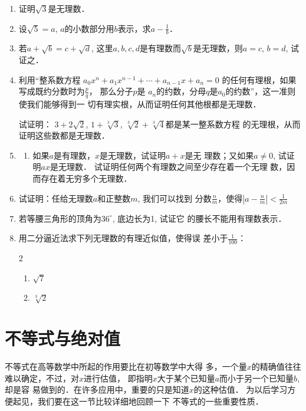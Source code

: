 \begin{enumerate}
    \item 证明$\sqrt{3}$是无理数．
    \item 设$\sqrt{5}=a$, $a$的小数部分用$b$表示，求$a-\frac{1}{b}$．
\item 若$a+\sqrt{b}=c+\sqrt{d}$, 这里$a,b,c,d$是有理数而$\sqrt{b}$是无理数，则$a=c$, $b=d$, 试证之．

\item 利用“整系数方程
$a_0x^n+a_1x^{n-1}+\cdots+a_{n-1}x+a_n=0$
的任何有理根，如果写成既约分数时为$\frac{p}{q}$，
那么分子$p$是
$a_n$的约数，分母$q$是$a_0$的约数”，这一准则使我们能够得到一
切有理实根，从而证明任何其他根都是无理数．

试证明：
$3+2\sqrt{2}$, $1+\sqrt[3]{3}$, $\sqrt[3]{2}+\sqrt[3]{4}$都是某一整系数方程
的无理根，从而证明这些数都是无理数．
\item \begin{enumerate}
    \item 如果$a$是有理数，$x$是无理数，试证明$a+x$是无
理数；又如果$a\ne 0$, 试证明$ax$是无理数．
\staritem 试证明任何两个有理数之间至少存在着一个无理
数，因而存在着无穷多个无理数．
\end{enumerate}

\item 试证明：任给无理数$a$和正整数$m$, 我们可以找到
分数$\frac{n}{m}$，使得$\left|a-\frac{n}{m}\right|<\frac{1}{2m}$
\item 若等腰三角形的顶角为$36^{\circ}$, 底边长为1, 试证它
的腰长不能用有理数表示．
\item 用二分逼近法求下列无理数的有理近似值，使得误
差小于$\frac{1}{100}$：
\begin{multicols}{2}
    \begin{enumerate}
        \item $\sqrt{7}$
        \item $\sqrt[3]{2}$
    \end{enumerate}
\end{multicols}
\end{enumerate}

\section{不等式与绝对值}
不等式在高等数学中所起的作用要比在初等数学中大得
多，一个量$x$的精确值往往难以确定，不过，对$x$进行估值，
即指明$x$大于某个已知量$a$而小于另一个已知量$b$, 却是容
易做到的．在许多应用中，重要的只是知道$x$的这种估值．
为以后学习方便起见，我们要在这一节比较详细地回顾一下
不等式的一些重要性质．

